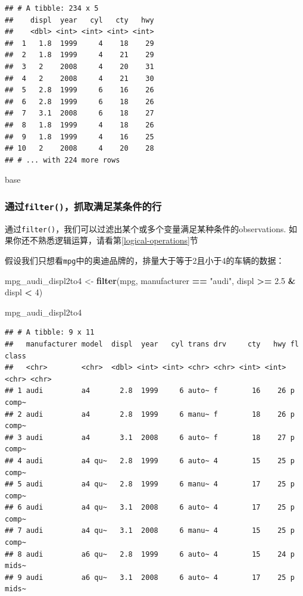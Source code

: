 \documentclass[]{book}
\newenvironment{Shaded}{\begin{snugshade}}{\end{snugshade}}
\newcommand{\DecValTok}[1]{\textcolor[rgb]{0.00,0.00,0.81}{#1}}
\newcommand{\FloatTok}[1]{\textcolor[rgb]{0.00,0.00,0.81}{#1}}
\newcommand{\KeywordTok}[1]{\textcolor[rgb]{0.13,0.29,0.53}{\textbf{#1}}}
\newcommand{\NormalTok}[1]{#1}
\newcommand{\OperatorTok}[1]{\textcolor[rgb]{0.81,0.36,0.00}{\textbf{#1}}}
\newcommand{\StringTok}[1]{\textcolor[rgb]{0.31,0.60,0.02}{#1}}
\begin{document}
\begin{verbatim}
## # A tibble: 234 x 5
##    displ  year   cyl   cty   hwy
##    <dbl> <int> <int> <int> <int>
##  1   1.8  1999     4    18    29
##  2   1.8  1999     4    21    29
##  3   2    2008     4    20    31
##  4   2    2008     4    21    30
##  5   2.8  1999     6    16    26
##  6   2.8  1999     6    18    26
##  7   3.1  2008     6    18    27
##  8   1.8  1999     4    18    26
##  9   1.8  1999     4    16    25
## 10   2    2008     4    20    28
## # ... with 224 more rows
\end{verbatim}

base

\hypertarget{filter}{%
\subsubsection{\texorpdfstring{通过\texttt{filter()}，抓取满足某条件的行}{通过filter()，抓取满足某条件的行}}\label{filter}}

通过\texttt{filter()}，我们可以过滤出某个或多个变量满足某种条件的observations. 如果你还不熟悉逻辑运算，请看第\ref{logical-operations}节

假设我们只想看\texttt{mpg}中的奥迪品牌的，排量大于等于2且小于4的车辆的数据：

\begin{Shaded}
\begin{Highlighting}[]
\NormalTok{mpg_audi_displ2to4 <-}\StringTok{ }\KeywordTok{filter}\NormalTok{(mpg, manufacturer }\OperatorTok{==}\StringTok{ "audi"}\NormalTok{, displ }\OperatorTok{>=}\StringTok{ }\FloatTok{2.5} \OperatorTok{&}\StringTok{ }\NormalTok{displ }\OperatorTok{<}\StringTok{ }\DecValTok{4}\NormalTok{)}

\NormalTok{mpg_audi_displ2to4}
\end{Highlighting}
\end{Shaded}

\begin{verbatim}
## # A tibble: 9 x 11
##   manufacturer model  displ  year   cyl trans drv     cty   hwy fl    class
##   <chr>        <chr>  <dbl> <int> <int> <chr> <chr> <int> <int> <chr> <chr>
## 1 audi         a4       2.8  1999     6 auto~ f        16    26 p     comp~
## 2 audi         a4       2.8  1999     6 manu~ f        18    26 p     comp~
## 3 audi         a4       3.1  2008     6 auto~ f        18    27 p     comp~
## 4 audi         a4 qu~   2.8  1999     6 auto~ 4        15    25 p     comp~
## 5 audi         a4 qu~   2.8  1999     6 manu~ 4        17    25 p     comp~
## 6 audi         a4 qu~   3.1  2008     6 auto~ 4        17    25 p     comp~
## 7 audi         a4 qu~   3.1  2008     6 manu~ 4        15    25 p     comp~
## 8 audi         a6 qu~   2.8  1999     6 auto~ 4        15    24 p     mids~
## 9 audi         a6 qu~   3.1  2008     6 auto~ 4        17    25 p     mids~
\end{verbatim}
\end{document}
